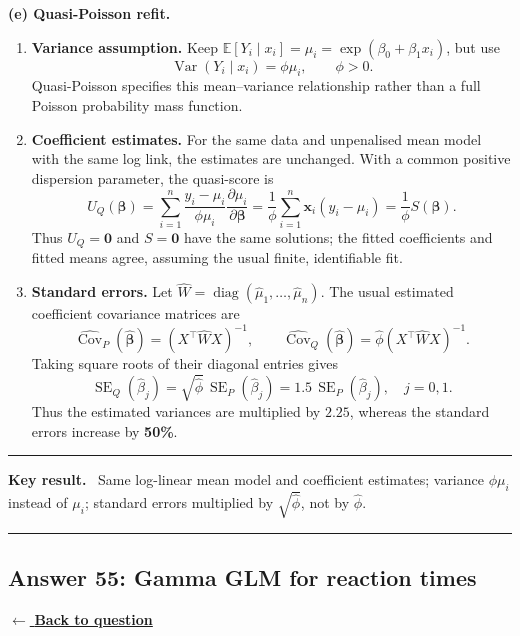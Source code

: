 \documentclass[11pt,a4paper]{article}
\newcommand{\given}{\mathrel{|}}
\newcommand{\E}{\mathbb{E}}
\newcommand{\answernav}[1]{%
  \label{answer:#1}%
  \noindent\hyperref[question:#1]{$\leftarrow$ \textbf{Back to question}}%
  \par\smallskip}
\newenvironment{keyresult}
  {\begin{center}\begin{minipage}{0.92\linewidth}\color{statblue}%
   \hrule\vspace{6pt}\textbf{Key result.}\ }
  {\vspace{6pt}\hrule\end{minipage}\end{center}}
\begin{document}
\textbf{(e) Quasi-Poisson refit.}
\begin{enumerate}[label=\arabic*.]
  \item \textbf{Variance assumption.} Keep
        $\E[Y_i\given x_i]=\mu_i=\exp(\beta_0+\beta_1x_i)$, but use
        \[
        \boxed{\operatorname{Var}(Y_i\given x_i)=\phi\mu_i,\qquad\phi>0.}
        \]
        Quasi-Poisson specifies this mean--variance relationship rather
        than a full Poisson probability mass function.
  \item \textbf{Coefficient estimates.} For the same data and unpenalised
        mean model with the same log link, the estimates are unchanged.
        With a common positive dispersion parameter, the quasi-score is
        \[
        U_Q(\boldsymbol\beta)
        =\sum_{i=1}^n\frac{y_i-\mu_i}{\phi\mu_i}
          \frac{\partial\mu_i}{\partial\boldsymbol\beta}
        =\frac1\phi\sum_{i=1}^n\mathbf x_i(y_i-\mu_i)
        =\frac1\phi S(\boldsymbol\beta).
        \]
        Thus $U_Q=\mathbf0$ and $S=\mathbf0$ have the same solutions;
        the fitted coefficients and fitted means agree, assuming the
        usual finite, identifiable fit.
  \item \textbf{Standard errors.} Let
        $\widehat W=\operatorname{diag}(\hat\mu_1,\ldots,\hat\mu_n)$.
        The usual estimated coefficient covariance matrices are
        \[
        \widehat{\operatorname{Cov}}_P(\hat{\boldsymbol\beta})
        =(X^\top\widehat W X)^{-1},\qquad
        \widehat{\operatorname{Cov}}_Q(\hat{\boldsymbol\beta})
        =\hat\phi(X^\top\widehat W X)^{-1}.
        \]
        Taking square roots of their diagonal entries gives
        \[
        \boxed{
        \operatorname{SE}_Q(\hat\beta_j)
        =\sqrt{\hat\phi}\,\operatorname{SE}_P(\hat\beta_j)
        =1.5\,\operatorname{SE}_P(\hat\beta_j),\quad j=0,1.
        }
        \]
        Thus the estimated variances are multiplied by $2.25$, whereas
        the standard errors increase by \textbf{50\%}.
\end{enumerate}

\begin{keyresult}
Same log-linear mean model and coefficient estimates; variance
$\phi\mu_i$ instead of $\mu_i$; standard errors multiplied by
$\sqrt{\hat\phi}$, not by $\hat\phi$.
\end{keyresult}

\clearpage

\subsection{Answer 55: Gamma GLM for reaction times}
\answernav{55}
\end{document}
